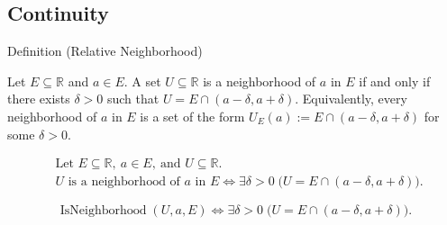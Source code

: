 
\subsection*{Continuity}
\label{sec:continuity}


\begin{definitionbox}{Definition (Relative Neighborhood)}
\begin{definition}
\label{def:relative-neighborhood}
Let $E \subseteq \mathbb{R}$ and $a \in E$. A set $U \subseteq \mathbb{R}$ is a neighborhood of $a$ in $E$ if and only if there exists $\delta > 0$ such that $U = E \cap (a-\delta, a+\delta)$. Equivalently, every neighborhood of $a$ in $E$ is a set of the form $U_E(a) := E \cap (a-\delta, a+\delta)$ for some $\delta > 0$.
\end{definition}
\end{definitionbox}

\begin{remark*}
\[
\begin{aligned}
&\text{Let } E \subseteq \mathbb{R},\ a \in E,\ \text{and } U \subseteq \mathbb{R}.\\
&U \text{ is a neighborhood of } a \text{ in } E
\Longleftrightarrow
\exists \delta > 0\; \bigl(U = E \cap (a-\delta, a+\delta)\bigr).
\end{aligned}
\]
\end{remark*}

\begin{remark*}
\[
\operatorname{IsNeighborhood}(U,a,E)
\Longleftrightarrow
\exists \delta > 0\;
\bigl(U = E \cap (a-\delta, a+\delta)\bigr).
\]
\end{remark*}

